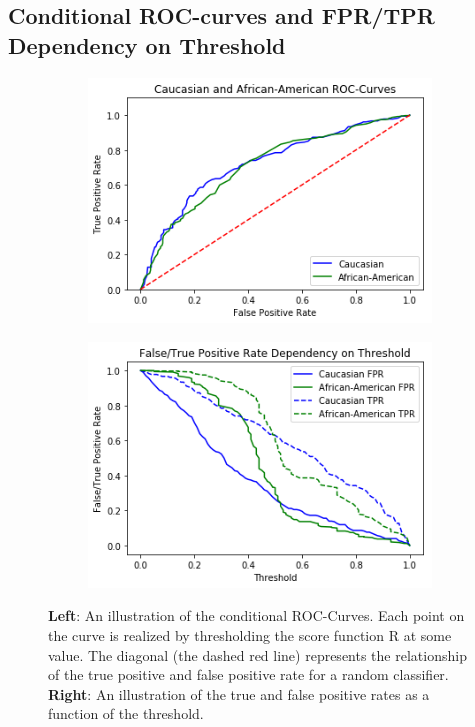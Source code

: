 \documentclass[11pt, fleqn, titlepage]{article}
\begin{document}
	\subsection{Conditional ROC-curves and FPR/TPR Dependency on Threshold}\label{ROC}
	
	\begin{figure}[H]
		\centering
		\begin{subfigure}{0.5\textwidth}
			\centering
			\includegraphics[width=0.9\linewidth]{imgs/ROC.png}
		\end{subfigure}%
		\begin{subfigure}{0.5\textwidth}
			\centering
			\includegraphics[width=0.9\linewidth]{imgs/fpr_tpr_plot.png}
		\end{subfigure}
		\caption{\textbf{Left}: An illustration of the conditional ROC-Curves. Each point on the curve is realized by thresholding the score function R at some value. The diagonal (the dashed red line) represents the relationship of the true positive and false positive rate for a random classifier. \textbf{Right}: An illustration of the true and false positive rates as a function of the threshold.}
		\label{fig:roc-curve}
	\end{figure}
\end{document}
